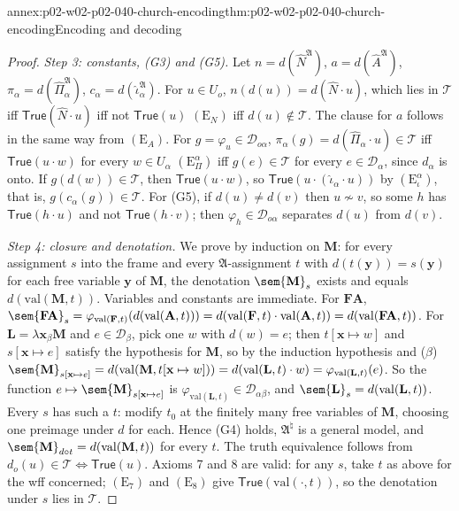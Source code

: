 \begin{annexitem}{annex:p02-w02-p02-040-church-encoding}{thm:p02-w02-p02-040-church-encoding}{Encoding and decoding}
\begin{proof}
\emph{Step 3: constants, (G3) and (G5).}  Let \(n=d(\widehat N^{\mathfrak A})\),
\(a=d(\widehat A^{\mathfrak A})\), \(\pi_\alpha=d(\widehat\Pi_\alpha^{\mathfrak A})\),
\(c_\alpha=d(\widehat\iota_\alpha^{\mathfrak A})\).  For \(u\in U_o\),
\(n(d(u))=d(\widehat N\cdot u)\), which lies in \(\mathcal T\) iff
\(\mathsf{True}(\widehat N\cdot u)\) iff not \(\mathsf{True}(u)\)
\((\mathrm E_N)\) iff \(d(u)\notin\mathcal T\).  The clause for \(a\) follows in
the same way from \((\mathrm E_A)\).  For \(g=\varphi_u\in\mathcal D_{o\alpha}\),
\(\pi_\alpha(g)=d(\widehat\Pi_\alpha\cdot u)\in\mathcal T\) iff
\(\mathsf{True}(u\cdot w)\) for every \(w\in U_\alpha\) \((\mathrm E_\Pi^\alpha)\)
iff \(g(e)\in\mathcal T\) for every \(e\in\mathcal D_\alpha\), since \(d_\alpha\) is
onto.  If \(g(d(w))\in\mathcal T\), then \(\mathsf{True}(u\cdot w)\), so
\(\mathsf{True}(u\cdot(\widehat\iota_\alpha\cdot u))\) by
\((\mathrm E_\iota^\alpha)\), that is, \(g(c_\alpha(g))\in\mathcal T\).  For (G5),
if \(d(u)\neq d(v)\) then \(u\not\sim v\), so some \(h\) has
\(\mathsf{True}(h\cdot u)\) and not \(\mathsf{True}(h\cdot v)\); then
\(\varphi_h\in\mathcal D_{o\alpha}\) separates \(d(u)\) from \(d(v)\).

\emph{Step 4: closure and denotation.}  We prove by induction on
\(\mathbf M\): for every assignment \(s\) into the frame and every
\(\mathfrak A\)-assignment \(t\) with \(d(t(\mathbf y))=s(\mathbf y)\) for each
free variable \(\mathbf y\) of \(\mathbf M\), the denotation
\(\sem{\mathbf M}_s\) exists and equals \(d(\mathrm{val}(\mathbf M,t))\).
Variables and constants are immediate.  For \(\mathbf F\mathbf A\),
\(\sem{\mathbf F\mathbf A}_s=\varphi_{\mathrm{val}(\mathbf F,t)}(d(\mathrm{val}(\mathbf A,t)))=d(\mathrm{val}(\mathbf F,t)\cdot\mathrm{val}(\mathbf A,t))=d(\mathrm{val}(\mathbf F\mathbf A,t))\).
For \(\mathbf L=\lambda\mathbf x_\beta\mathbf M\) and \(e\in\mathcal D_\beta\), pick
one \(w\) with \(d(w)=e\); then \(t[\mathbf x\mapsto w]\) and
\(s[\mathbf x\mapsto e]\) satisfy the hypothesis for \(\mathbf M\), so by the
induction hypothesis and (\(\beta\))
\(\sem{\mathbf M}_{s[\mathbf x\mapsto e]}=d(\mathrm{val}(\mathbf M,t[\mathbf x\mapsto w]))=d(\mathrm{val}(\mathbf L,t)\cdot w)=\varphi_{\mathrm{val}(\mathbf L,t)}(e)\).
So the function \(e\mapsto\sem{\mathbf M}_{s[\mathbf x\mapsto e]}\) is
\(\varphi_{\mathrm{val}(\mathbf L,t)}\in\mathcal D_{\alpha\beta}\), and
\(\sem{\mathbf L}_s=d(\mathrm{val}(\mathbf L,t))\).  Every \(s\) has such a \(t\):
modify \(t_0\) at the finitely many free variables of \(\mathbf M\), choosing
one preimage under \(d\) for each.  Hence (G4) holds, \(\mathfrak A^\natural\) is
a general model, and \(\sem{\mathbf M}_{d\circ t}=d(\mathrm{val}(\mathbf M,t))\)
for every \(t\).  The truth equivalence follows from
\(d_o(u)\in\mathcal T\Leftrightarrow\mathsf{True}(u)\).  Axioms 7 and 8 are valid:
for any \(s\), take \(t\) as above for the wff concerned; \((\mathrm E_7)\) and
\((\mathrm E_8)\) give \(\mathsf{True}(\mathrm{val}(\cdot,t))\), so the denotation
under \(s\) lies in \(\mathcal T\).


\end{proof}
\end{annexitem}
